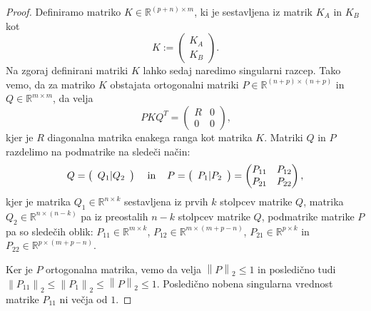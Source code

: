\documentclass[mat1]{article}
\newcommand{\norm}[1]{\left\lVert#1\right\rVert}
\begin{document}
\begin{proof}
Definiramo matriko $K \in \mathbb{R}^{(p+n) \times m}$, ki je sestavljena iz matrik $K_A$ in $K_B$ kot $$K:= \begin{pmatrix} 
K_A \\
K_B 
\end{pmatrix}.$$
Na zgoraj definirani matriki $K$ lahko sedaj naredimo singularni razcep. Tako vemo, da za matriko $K$ obstajata ortogonalni matriki $P \in \mathbb{R}^{(n+p) \times (n+p)}$ in $Q \in \mathbb{R}^{m \times m}$, da velja $$ P K Q^T = 
\begin{pmatrix} 
R & 0 \\
0 & 0 
\end{pmatrix} \text{,}$$ kjer je $R$ diagonalna matrika enakega ranga kot matrika $K$. Matriki $Q$ in $P$ razdelimo na podmatrike na sledeči način:
$$  Q = \left(\begin{array}{c} Q_1 | Q_2 \end{array}\right)
\hspace{4mm} \text{in} \hspace{4mm}
P = \left(\begin{array}{c} P_1 | P_2 \end{array}\right)
=
\begin{pmatrix} 
P_{11} & P_{12} \\
P_{21} & P_{22} 
\end{pmatrix},
$$
kjer je matrika $Q_1 \in \mathbb{R}^{n \times k}$ sestavljena iz prvih $k$ stolpcev matrike $Q$, matrika $Q_2 \in \mathbb{R}^{n \times (n-k)}$ pa iz preostalih $n-k$ stolpcev matrike $Q$, podmatrike matrike $P$ pa so sledečih oblik: $P_{11} \in \mathbb{R}^{m \times k}$, $P_{12} \in \mathbb{R}^{m \times (m+p-n)}$, $P_{21} \in \mathbb{R}^{p \times k}$ in $P_{22} \in \mathbb{R}^{p \times (m+p-n)}$.

Ker je $P$ ortogonalna matrika, vemo da velja $\norm{P}_2 \leq 1$ in posledično tudi $\norm{P_{11}}_2 \leq \norm{P_{1}}_2 \leq \norm{P}_2 \leq 1$. Posledično nobena singularna vrednost matrike $P_{11}$ ni večja od $1$. %


\end{proof}
\end{document}
